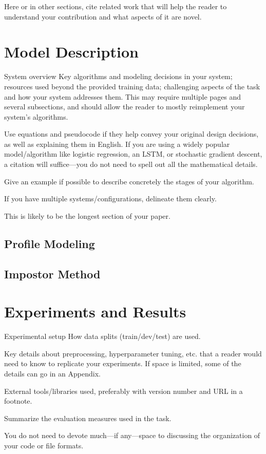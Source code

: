 \documentclass{llncs}
\begin{document}
Here or in other sections, cite related work that will help the reader to understand your contribution and what aspects of it are novel.

\section{Model Description}
System overview
Key algorithms and modeling decisions in your system; resources used beyond the provided training data; challenging aspects of the task and how your system addresses them. This may require multiple pages and several subsections, and should allow the reader to mostly reimplement your system’s algorithms.

Use equations and pseudocode if they help convey your original design decisions, as well as explaining them in English. If you are using a widely popular model/algorithm like logistic regression, an LSTM, or stochastic gradient descent, a citation will suffice—you do not need to spell out all the mathematical details.

Give an example if possible to describe concretely the stages of your algorithm.

If you have multiple systems/configurations, delineate them clearly.

This is likely to be the longest section of your paper.
\subsection{Profile Modeling}
\subsection{Impostor Method}
\section{Experiments and Results}
Experimental setup
How data splits (train/dev/test) are used.

Key details about preprocessing, hyperparameter tuning, etc. that a reader would need to know to replicate your experiments. If space is limited, some of the details can go in an Appendix.

External tools/libraries used, preferably with version number and URL in a footnote.

Summarize the evaluation measures used in the task.

You do not need to devote much—if any—space to discussing the organization of your code or file formats.
\end{document}
